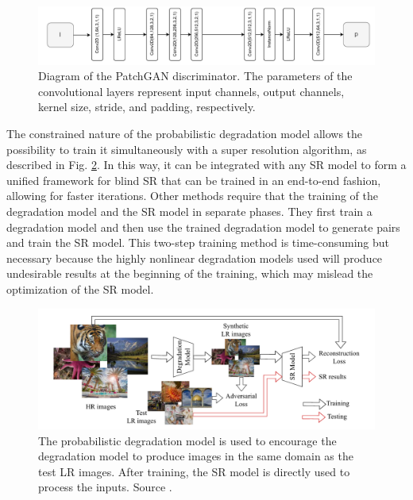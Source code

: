     \begin{figure}[H]
        \centering
        \includegraphics[width=\textwidth]{Includes/3-slim_patchGAN_architecture.pdf}
        \caption{Diagram of the PatchGAN discriminator.
                 The parameters of the convolutional layers represent input channels, output channels, kernel size, stride, and padding, respectively. }
        \label{fig:3-slim-patchgan-module}
    \end{figure}

    
    The constrained nature of the probabilistic degradation model allows the possibility to train it simultaneously with a super resolution algorithm, as described in Fig. \ref{fig:3-GAN-degradation-model}.      
    In this way, it can be integrated with any SR model to form a unified framework for blind SR that can be trained in an end-to-end fashion, allowing for faster iterations.
    Other methods \cite{fritsche2019frequency,wei2020unsupervised} require that the training of the degradation model and the SR model in separate phases. They first train a degradation model and then use the trained degradation model to generate pairs and train the SR model.
    This two-step training method is time-consuming but necessary because the highly nonlinear degradation models used will produce undesirable results at the beginning of the training, which may mislead the optimization of the SR model.

    \begin{figure}[H]
        \centering
        \includegraphics[width=\textwidth]{Includes/3-GAN-degradation-model.png}
        \caption{The probabilistic degradation model is used to encourage the degradation model to produce images in the same domain as the test LR images.
                After training, the SR model is directly used to process the inputs.
                Source \cite{luo2022learning}.}
        \label{fig:3-GAN-degradation-model}
    \end{figure}

